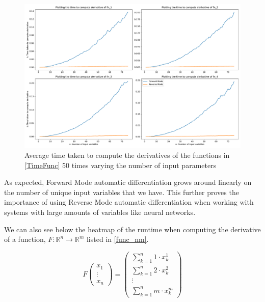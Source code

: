 \documentclass{article}
\begin{document}
\begin{figure}[h]
    \centering
    \includegraphics[width=15cm]{images/Graph_TimeDiff2.pdf}
    \caption{Average time taken to compute the derivatives of the functions in \eqref{TimeFunc} 50 times varying the number of input parameters}
    \label{fig:TimeDiff}
\end{figure}

As expected, Forward Mode automatic differentiation grows around linearly on the number of unique input variables that we have. This further proves the importance of using Reverse Mode automatic differentiation when working with systems with large amounts of variables like neural networks.

We can also see below the heatmap of the runtime when computing the derivative of a function, $F: \mathbb{R}^n \rightarrow \mathbb{R}^m$ listed in \eqref{func_nm}.

\begin{equation}
    F \begin{pmatrix}
        x_1 \\ \vdots \\ x_n
    \end{pmatrix} = \begin{pmatrix}
        \sum_{k=1}^n 1 \cdot x_k^1 \\ \sum_{k=1}^n 2 \cdot x_{k}^{2} \\ \vdots \\ \sum_{k=1}^n m \cdot x_{k}^{m}
    \end{pmatrix}
    \label{func_nm}
\end{equation}
\end{document}
